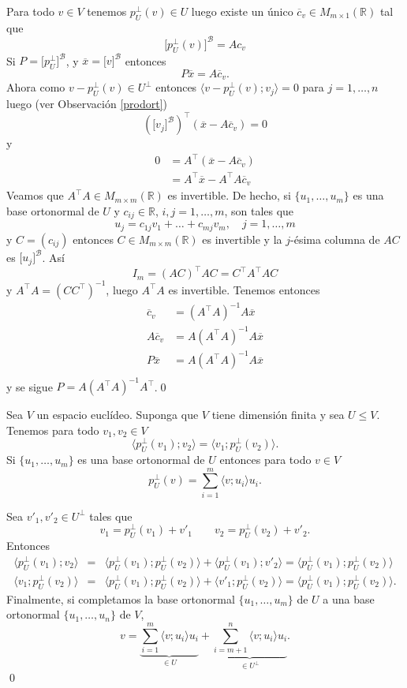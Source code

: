 \dem Para todo $v\in V$ tenemos $p^\perp_U(v)\in U$ luego existe un \'unico $\overline{c}_v\in M_{m\times 1}(\mathbb{R})$ tal que
$$\Big[p^\perp_U(v)\Big]^\mathcal{B}=Ac_v$$
Si $P=\Big[p^\perp_U\Big]^\mathcal{B}$, y $\overline{x}=\Big[v\Big]^\mathcal{B}$ entonces
$$P\overline{x}=A\overline{c}_v.$$
Ahora como $v-p^\perp_U(v)\in U^\perp$ entonces $\langle v-p^\perp_U(v);v_j\rangle=0$ para $j=1,\ldots,n$ luego (ver Observaci\'on \ref{prodort})
$$\left(\Big[v_j\Big]^\mathcal{B}\right)^\intercal (\overline{x}-A\overline{c}_v)=0$$
y
\begin{align*}
0 &= A^\intercal(\overline{x}-A\overline{c}_v)\\
 &= A^\intercal\overline{x}-A^\intercal A\overline{c}_v
\end{align*}
Veamos que $A^\intercal A\in M_{m\times m}(\mathbb{R})$ es invertible. De hecho, si $\{u_1,\ldots,u_m\}$ es una base ortonormal de $U$ y $c_{ij}\in\mathbb{R}$, $i,j=1,\ldots,m$, son tales que
$$u_j=c_{1j}v_1+\ldots+c_{mj}v_m,\quad j=1,\ldots,m$$
y $C=(c_{ij})$ entonces $C\in M_{m\times m}(\mathbb{R})$ es invertible y la $j$-\'esima columna de $AC$ es $\Big[u_j\Big]^\mathcal{B}$. As\'i
$$I_m=(AC)^\intercal AC=C^\intercal A^\intercal A C$$
y $A^\intercal A=(CC^\intercal)^{-1}$, luego $A^\intercal A$ es invertible. Tenemos entonces
\begin{align*}
\overline{c}_v & = (A^\intercal A)^{-1}A\overline{x}\\
A\overline{c}_v & =  A(A^\intercal A)^{-1}A\overline{x}\\
P\overline{x} & =  A(A^\intercal A)^{-1}A\overline{x}\\
\end{align*}
y se sigue $P=A(A^\intercal A)^{-1}A^\intercal$.\qed
\begin{pro}\label{proyautoadj}
Sea $V$ un espacio eucl\'ideo. Suponga que $V$ tiene dimensi\'on finita y sea $U\le V$. Tenemos para todo $v_1,v_2\in V$
\[
\langle p^\perp_U(v_1);v_2\rangle=\langle v_1;p^\perp_U(v_2)\rangle.
\]
Si $\{u_1,\ldots,u_m\}$ es una base ortonormal de $U$ entonces para todo $v\in V$
\[
p^\perp_U(v)=\sum_{i=1}^m\langle v;u_i\rangle u_i.
\]
\end{pro}

\dem Sea $v'_1,v'_2\in U^\perp$ tales que
\[
v_1=p^\perp_U(v_1)+v'_1 \qquad v_2=p^\perp_U(v_2)+v'_2.
\]
Entonces
\begin{eqnarray*}
\langle p^\perp_U(v_1);v_2\rangle & = & \langle p^\perp_U(v_1);p^\perp_U(v_2)\rangle+\langle p^\perp_U(v_1);v'_2\rangle=\langle p^\perp_U(v_1);p^\perp_U(v_2)\rangle\\
\langle v_1;p^\perp_U(v_2)\rangle & = & \langle p^\perp_U(v_1);p^\perp_U(v_2)\rangle+\langle v'_1;p^\perp_U(v_2)\rangle=\langle p^\perp_U(v_1);p^\perp_U(v_2)\rangle.
\end{eqnarray*}
Finalmente, si completamos la base ortonormal $\{u_1,\ldots,u_m\}$ de $U$ a una base ortonormal $\{u_1,\ldots,u_n\}$ de $V$,
\[
v=\underbrace{\sum_{i=1}^m\langle v;u_i\rangle u_i}_{\in U}+\underbrace{\sum_{i=m+1}^n\langle v;u_i\rangle u_i}_{\in U^\perp}.
\]
\qed

